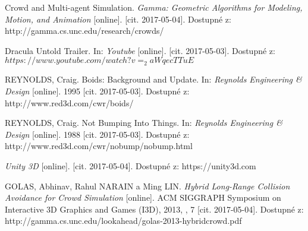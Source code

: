 \begin{thebibliography}{99}

Crowd and Multi-agent Simulation. \textit{Gamma: Geometric Algorithms for Modeling, Motion, and Animation} [online]. [cit. 2017-05-04]. Dostupné z: http://gamma.cs.unc.edu/research/crowds/

Dracula Untold Trailer. In: \textit{Youtube} [online]. [cit. 2017-05-03]. Dostupné z: $https://www.youtube.com/watch?v=_2aWqecTTuE$

REYNOLDS, Craig. Boids: Background and Update. In: \textit{Reynolds Engineering \& Design} [online]. 1995 [cit. 2017-05-03]. Dostupné z: http://www.red3d.com/cwr/boids/

REYNOLDS, Craig. Not Bumping Into Things. In: \textit{Reynolds Engineering \& Design} [online]. 1988 [cit. 2017-05-03]. Dostupné z: http://www.red3d.com/cwr/nobump/nobump.html

\textit{Unity 3D} [online]. [cit. 2017-05-04]. Dostupné z: https://unity3d.com

GOLAS, Abhinav, Rahul NARAIN a Ming LIN. \textit{Hybrid Long-Range Collision Avoidance for Crowd Simulation} [online]. ACM SIGGRAPH Symposium on Interactive 3D Graphics and Games (I3D), 2013, , 7 [cit. 2017-05-04]. Dostupné z: http://gamma.cs.unc.edu/lookahead/golas-2013-hybridcrowd.pdf

\end{thebibliography}